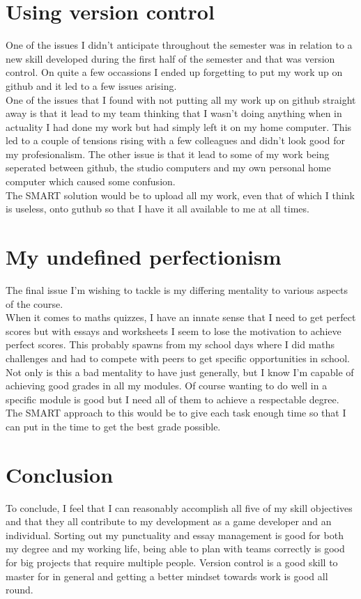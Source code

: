 \documentclass{scrartcl}
\begin{document}
\section{Using version control}

One of the issues I didn't anticipate throughout the semester was in relation to a new skill developed during the first half of the semester and that was version control. On quite a few occassions I ended up forgetting to put my work up on github and it led to a few issues arising.
\\
One of the issues that I found with not putting all my work up on github straight away is that it lead to my team thinking that I wasn't doing anything when in actuality I had done my work but had simply left it on my home computer. This led to a couple of tensions rising with a few colleagues and didn't look good for my profesionalism. The other issue is that it lead to some of my work being seperated between github, the studio computers and my own personal home computer which caused some confusion.
\\
The SMART solution would be to upload all my work, even that of which I think is useless, onto guthub so that I have it all available to me at all times.

\section{My undefined perfectionism}

The final issue I'm wishing to tackle is my differing mentality to various aspects of the course.
\\
When it comes to maths quizzes, I have an innate sense that I need to get perfect scores but with essays and worksheets I seem to lose the motivation to achieve perfect scores. This probably spawns from my school days where I did maths challenges and had to compete with peers to get specific opportunities in school. Not only is this a bad mentality to have just generally, but I know I'm capable of achieving good grades in all my modules. Of course wanting to do well in a specific module is good but I need all of them to achieve a respectable degree.
\\
The SMART approach to this would be to give each task enough time so that I can put in the time to get the best grade possible.

\section{Conclusion}

To conclude, I feel that I can reasonably accomplish all five of my skill objectives and that they all contribute to my development as a game developer and an individual. Sorting out my punctuality and essay management is good for both my degree and my working life, being able to plan with teams correctly is good for big projects that require multiple people. Version control is a good skill to master for in general and getting a better mindset towards work is good all round.



\end{document}
